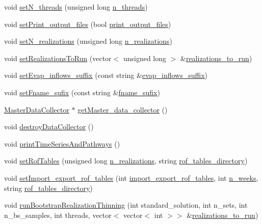 \begin{DoxyCompactItemize}
\item 
void \mbox{\hyperlink{classProblem_ad770920d19d5276fd0e30b835abe21ef}{set\+N\+\_\+threads}} (unsigned long \mbox{\hyperlink{classProblem_a3303a162d648e8ae16153b57b5b4054f}{n\+\_\+threads}})
\item 
void \mbox{\hyperlink{classProblem_a1f055d5e57392700cab27efdd4577be9}{set\+Print\+\_\+output\+\_\+files}} (bool \mbox{\hyperlink{classProblem_a3372a73270ce989f5d2056cace66215b}{print\+\_\+output\+\_\+files}})
\item 
void \mbox{\hyperlink{classProblem_ae5cec2ad575abb95cf7304153c31e410}{set\+N\+\_\+realizations}} (unsigned long \mbox{\hyperlink{classProblem_a270a5672643bfe09e52e0f24e1884136}{n\+\_\+realizations}})
\item 
void \mbox{\hyperlink{classProblem_afe5ddeb70b303e4971251e92a10f4828}{set\+Realizations\+To\+Run}} (vector$<$ unsigned long $>$ \&\mbox{\hyperlink{classProblem_af9ed9265d0d2b4918bd468d717429de1}{realizations\+\_\+to\+\_\+run}})
\item 
void \mbox{\hyperlink{classProblem_afb5e51664d0f340c393f7583622e99ca}{set\+Evap\+\_\+inflows\+\_\+suffix}} (const string \&\mbox{\hyperlink{classProblem_a1ff3958eef8bfb851a84ce0772104dca}{evap\+\_\+inflows\+\_\+suffix}})
\item 
void \mbox{\hyperlink{classProblem_ad666ae2c231f49103593a7e03a3b58fd}{set\+Fname\+\_\+sufix}} (const string \&\mbox{\hyperlink{classProblem_a59444139a907aaf4c6159caed46c8118}{fname\+\_\+sufix}})
\item 
\mbox{\hyperlink{classMasterDataCollector}{Master\+Data\+Collector}} $\ast$ \mbox{\hyperlink{classProblem_afce904c6b3bc58d029da4d9077efe4c9}{get\+Master\+\_\+data\+\_\+collector}} ()
\item 
void \mbox{\hyperlink{classProblem_af87d1081eb2a8fa57fa7f2666292fee3}{destroy\+Data\+Collector}} ()
\item 
void \mbox{\hyperlink{classProblem_a77568843acf22f2ecd17a83a1f3f310a}{print\+Time\+Series\+And\+Pathways}} ()
\item 
void \mbox{\hyperlink{classProblem_aa9debdf28260fd9054f7d6d2ee516f94}{set\+Rof\+Tables}} (unsigned long \mbox{\hyperlink{classProblem_a270a5672643bfe09e52e0f24e1884136}{n\+\_\+realizations}}, string \mbox{\hyperlink{classProblem_abc641b49a4defb0dbabafbf3f9dbca6e}{rof\+\_\+tables\+\_\+directory}})
\item 
void \mbox{\hyperlink{classProblem_a13b247f6699ebad04cbd5df07e681ba0}{set\+Import\+\_\+export\+\_\+rof\+\_\+tables}} (int \mbox{\hyperlink{classProblem_ac5a286f34cec786a0ad56c77783a201c}{import\+\_\+export\+\_\+rof\+\_\+tables}}, int \mbox{\hyperlink{classProblem_ac7513bb0ecdfa4bbb7d2ada3595d71ec}{n\+\_\+weeks}}, string \mbox{\hyperlink{classProblem_abc641b49a4defb0dbabafbf3f9dbca6e}{rof\+\_\+tables\+\_\+directory}})
\item 
void \mbox{\hyperlink{classProblem_a3604aafc0cf731fc9dfa8589ec8995ce}{run\+Bootstrap\+Realization\+Thinning}} (int standard\+\_\+solution, int n\+\_\+sets, int n\+\_\+bs\+\_\+samples, int threads, vector$<$ vector$<$ int $>$$>$ \&\mbox{\hyperlink{classProblem_af9ed9265d0d2b4918bd468d717429de1}{realizations\+\_\+to\+\_\+run}})
\end{DoxyCompactItemize}
